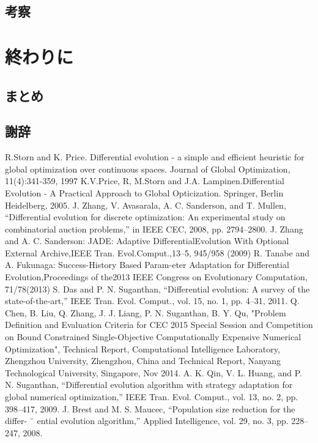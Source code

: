 \documentclass[a4paper,11pt,oneside,openany]{jsbook}
\begin{document}
\section{考察}

\chapter{終わりに}
\section{まとめ}
\section{謝辞}

\begin{thebibliography}{10}
  R.Storn and K. Price. Differential evolution - a simple and efficient heuristic for global optimization over continuous spaces. Journal of Global Optimization, 11(4):341-359, 1997
  K.V.Price, R, M.Storn and J.A. Lampinen.Differential Evolution - A Practical Approach to Global Opticization. Springer, Berlin Heidelberg, 2005.
   J. Zhang, V. Avasarala, A. C. Sanderson, and T. Mullen, “Differential
evolution for discrete optimization: An experimental study on combinatorial
auction problems,” in IEEE CEC, 2008, pp. 2794–2800.
  J. Zhang and A. C. Sanderson: JADE: Adaptive DifferentialEvolution With Optional External Archive,IEEE Tran. Evol.Comput.,13–5, 945/958 (2009)
  R. Tanabe and A. Fukunaga: Success-History Based Param-eter Adaptation for Differential Evolution,Proceedings of the2013 IEEE Congress on Evolutionary Computation, 71/78(2013)
  S. Das and P. N. Suganthan, “Differential evolution: A survey of the
state-of-the-art,” IEEE Tran. Evol. Comput., vol. 15, no. 1, pp. 4–31,
2011.
  Q. Chen, B. Liu,  Q. Zhang, J. J. Liang, P. N. Suganthan, B. Y. Qu, "Problem Definition and Evaluation Criteria for CEC 2015 Special Session and Competition on Bound Constrained Single-Objective Computationally Expensive Numerical Optimization", Technical Report, Computational Intelligence Laboratory, Zhengzhou University, Zhengzhou, China  and  Technical Report, Nanyang Technological University, Singapore, Nov 2014.
   A. K. Qin, V. L. Huang, and P. N. Suganthan, “Differential evolution
algorithm with strategy adaptation for global numerical optimization,”
IEEE Tran. Evol. Comput., vol. 13, no. 2, pp. 398–417, 2009.
  J. Brest and M. S. Maucec, “Population size reduction for the differ- ˘
ential evolution algorithm,” Applied Intelligence, vol. 29, no. 3, pp.
228–247, 2008.

\end{thebibliography}
\end{document}
